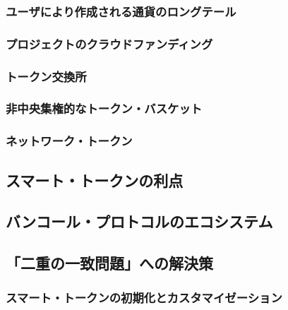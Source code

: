 \documentclass{jsarticle}
\begin{document}
\subsubsection{ユーザにより作成される通貨のロングテール}



\subsubsection{プロジェクトのクラウドファンディング}



\subsubsection{トークン交換所}



\subsubsection{非中央集権的なトークン・バスケット}



\subsubsection{ネットワーク・トークン}



\subsection{スマート・トークンの利点}



\subsection{バンコール・プロトコルのエコシステム}



\subsection{「二重の一致問題」への解決策}



\subsubsection{スマート・トークンの初期化とカスタマイゼーション}
\end{document}
